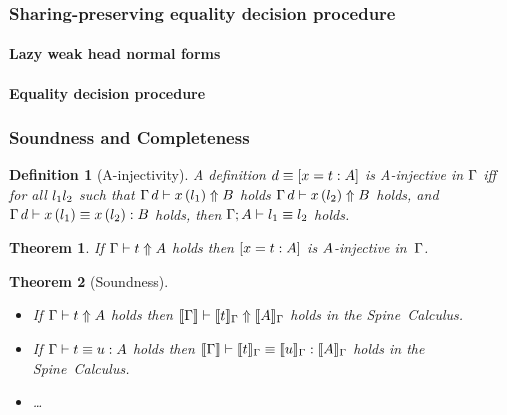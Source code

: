\documentclass[9pt,authoryear]{sigplanconf}
\newtheorem{theorem}{Theorem}
\newtheorem{definition}{Definition}
\begin{document}

\subsubsection{Sharing-preserving equality decision procedure}

\paragraph{Lazy weak head normal forms}


\paragraph{Equality decision procedure}


\subsubsection{Soundness and Completeness}

\begin{definition}[A-injectivity]
A definition $d \equiv [x = t : A]$ is A-injective
in $\Gamma$ iff for all $l_1 l_2$ such that
$\Gamma \, d \vdash x\,(l_1) \Uparrow B$ holds
$\Gamma \, d \vdash x\,(l_2) \Uparrow B$
holds, and
$\Gamma \, d \vdash x\,(l_1) \equiv x\,(l_2) : B$
holds, then $\Gamma; A \vdash l_1 \equiv l_2$ holds. 
\end{definition}

\begin{theorem}
If $\Gamma \vdash t \Uparrow A$ holds then $[x = t : A]$ is
$A$-injective in~$\Gamma$.
\end{theorem}

\begin{theorem}[Soundness]\ \\[-1em]
\begin{itemize}
\item  If $\Gamma \vdash t \Uparrow A$ holds then 
$\llbracket \Gamma \rrbracket \vdash \llbracket t \rrbracket_{\Gamma} \Uparrow \llbracket A \rrbracket_{\Gamma}$
holds in the Spine~Calculus. 
\item If $\Gamma \vdash t \equiv u : A$ holds then
$\llbracket \Gamma \rrbracket \vdash \llbracket t \rrbracket_{\Gamma} \equiv \llbracket u \rrbracket_{\Gamma} : \llbracket A \rrbracket_{\Gamma}$
holds in the Spine~Calculus. 
\item \ldots
\end{itemize}
\end{theorem}
\end{document}

